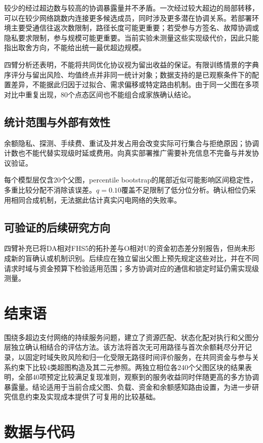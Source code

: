 \documentclass[UTF8,a4paper,twocolumn,fontset=none,zihao=5]{ctexart}
\begin{document}
较少的经过超边数与较高的协调暴露量并不矛盾。一次经过较大超边的局部转移，可以在较少网络跳数内连接更多候选成员，同时涉及更多潜在协调关系。若部署环境主要受通信往返次数限制，路径长度可能更重要；若受参与方签名、故障协调或隐私要求限制，参与规模可能更重要。当前实验未测量这些实现级代价，因此只能指出取舍方向，不能给出统一最优超边规模。


四臂分析还表明，不能将共同优化协议视为留出收益的保证。有限训练情景的字典序评分与留出风险、均值终点并非同一统计对象；数据支持的是已观察条件下的配置差异，不能据此归因于过拟合、需求偏移或特定路由机制。由于同一父图在多项对比中重复出现，80个点态区间也不能组合成家族确认结论。

\subsection{统计范围与外部有效性}

余额隐私、探测、手续费、重试及并发占用会改变实际可行集合与拒绝原因；协调计数也不能代替实现级时延或费用。向真实部署推广需要补充信息不完备与并发协议验证。


每个模型层仅含20个父图，percentile bootstrap的尾部近似可能影响区间稳定性，多重比较分配不消除该误差。$q=0.10$覆盖不足限制了低分位分析。确认相位仍采用相同合成机制，无法据此估计真实闪电网络的失败率。


\subsection{可验证的后续研究方向}

四臂补充已将DA相对FHS5的拓扑差与O相对U的资金初态差分别报告，但尚未形成新的盲确认或机制识别。后续应在独立留出父图上预先规定这些对比，并在不同请求时域与资金预算下检验适用范围；多方协调对应的通信和锁定时延仍需实现级测量。


\section{结束语}

围绕多超边支付网络的持续服务问题，建立了资源匹配、状态化配对执行和父图分层独立确认相结合的评估方法。该方法将首次无可用路径与首次余额耗尽分开记录，以固定时域失败风险和归一化受限无路径时间评价服务，在共同资金与参与关系约束下比较4类超图构造及其二元参照。两独立相位各240个父图区块的结果表明，全部40项预定比较满足复现准则，观察到的服务收益同时伴随更高的多方协调暴露量。结论适用于当前合成父图、负载、资金和余额感知路由设置，为进一步研究信息约束及实现成本提供了可复用的比较基础。


\section*{数据与代码}
\end{document}
